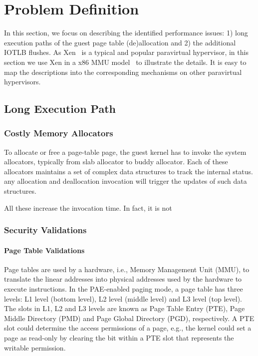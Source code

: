 \section{Problem Definition} \label{sec:prob}
In this section, we focus on describing the identified performance issues: 1) long execution paths of the guest page table (de)allocation and 2) the additional IOTLB flushes.
As Xen~\cite{XEN-SOSP03} is a typical and popular paravirtual hypervisor, in this section we use Xen in a x86 MMU model~\cite{x86-pv-model} to illustrate the details. 
It is easy to map the descriptions into the corresponding mechanisms on other paravirtual hypervisors.

\subsection{Long Execution Path}\label{sec:longpath}

\subsubsection{Costly Memory Allocators}
To allocate or free a page-table page, the guest kernel has to invoke the system allocators, typically from slab allocator to buddy allocator.
Each of these allocators maintains a set of complex data structures to track the internal status.
any allocation and deallocation invocation will trigger the updates of such data structures. 

All these increase the invocation time.
In fact, it is not 

\subsubsection{Security Validations}

\paragraph{Page Table Validations}\label{sec:pv-security}

Page tables are used by a hardware, i.e., Memory Management Unit (MMU), to translate the linear addresses into physical addresses used by the hardware to execute instructions.
In the PAE-enabled paging mode, a page table has three levels: L1 level (bottom level), L2 level (middle level) and L3 level (top level).
The slots in L1, L2 and L3 levels are known as Page Table Entry (PTE), Page Middle Directory (PMD) and Page Global Directory (PGD), respectively.
A PTE slot could determine the access permissions of a page, e.g., the kernel could set a page as read-only by clearing the bit within a PTE slot that represents the writable permission.

